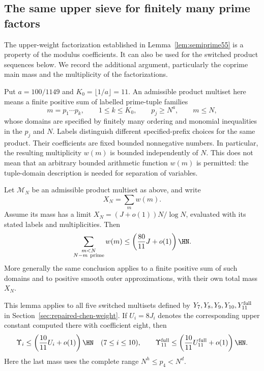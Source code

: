 
\subsection{The same upper sieve for finitely many prime factors}
\label{sec:primeproducts55}

The upper-weight factorization established in
Lemma~\ref{lem:semiprime55} is a property of the modulus coefficients.
It can also be used for the switched product sequences below.
We record the additional argument, particularly the coprime main
mass and the multiplicity of the factorizations.

Put $a=100/1149$ and $K_0=\lfloor1/a\rfloor=11$.
An admissible product multiset here means a finite positive sum
of labelled prime-tuple families
\[
 m=p_1\cdots p_k,\qquad 1\le k\le K_0,
 \qquad p_j\ge N^a,\qquad m\le N,
\]
whose domains are specified by finitely many ordering and monomial
inequalities in the $p_j$ and $N$. Labels distinguish different
specified-prefix choices for the same product.
Their coefficients are fixed bounded nonnegative numbers.
In particular, the resulting multiplicity $w(m)$ is bounded
independently of $N$. This does not mean that an arbitrary
bounded arithmetic function $w(m)$ is permitted: the tuple-domain
description is needed for separation of variables.

\begin{lemma}
\label{lem:primeproducts55}
Let $\mathcal M_N$ be an admissible product multiset as above,
and write
\[
 X_N=\sum_m w(m).
\]
Assume its mass has a limit
$X_N=(J+o(1))N/\log N$, evaluated with its stated labels and
multiplicities. Then
\begin{equation}\label{eq:primeproduct-prime-upper}
 \sum_{\substack{m<N\\N-m\ {\rm prime}}}w(m)
 \le\left(\frac{80}{11}J+o(1)\right)\HN .
\end{equation}
More generally the same conclusion applies to a finite positive
sum of such domains and to positive smooth outer approximations,
with their own total mass $X_N$.

This lemma applies to all five switched multisets defined by
$Y_7,Y_8,Y_9,Y_{10},Y_{11}^{\rm full}$ in
Section~\ref{sec:repaired-chen-weight}. If $U_i=8J_i$ denotes
the corresponding upper constant computed there with coefficient
eight, then
\begin{equation}\label{eq:switch-55}
 \Upsilon_i\le\left(\frac{10}{11}U_i+o(1)\right)\HN
 \quad(7\le i\le10),\qquad
 \Upsilon_{11}^{\rm full}
       \le\left(\frac{10}{11}U_{11}^{\rm full}+o(1)\right)\HN.
\end{equation}
Here the last mass uses the complete range
$N^h\le p_4<N^d$.
\end{lemma}

